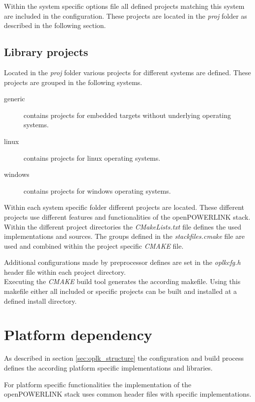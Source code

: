 Within the system specific options file all defined projects matching this system are included in the configuration.
These projects are located in the \emph{proj} folder as described in the following section.

\subsection{Library projects} %
\label{sec:oplk_structure_proj}
Located in the \emph{proj} folder various projects for different systems are defined.
These projects are grouped in the following systems.

\begin{description}
    \item[generic] contains projects for embedded targets without underlying operating systems.
    \item[linux] contains projects for linux operating systems.
    \item[windows] contains projects for windows operating systems.
\end{description}

Within each system specific folder different projects are located.
These different projects use different features and functionalities of the openPOWERLINK stack.
Within the different project directories the \emph{CMakeLists.txt} file defines the used implementations and sources.
The groups defined in the \emph{stackfiles.cmake} file are used and combined within the project specific \emph{CMAKE} file.

Additional configurations made by preprocessor defines are set in the \emph{oplkcfg.h} header file within each project directory.
\\

Executing the \emph{CMAKE} build tool generates the according makefile.
Using this makefile either all included or specific projects can be built and installed at a defined install directory.

\section{Platform dependency}
\label{sec:oplk_platform}
As described in section \ref{sec:oplk_structure} the configuration and build process defines the according platform specific implementations and libraries.

For platform specific functionalities the implementation of the openPOWERLINK stack uses common header files with specific implementations.

